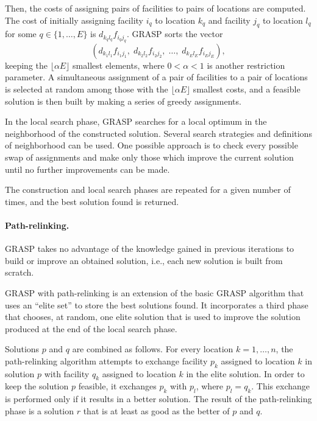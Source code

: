 Then, the costs of assigning pairs of facilities to pairs of locations are
computed. The cost of initially assigning facility $i_q$ to location $k_q$ and
facility $j_q$ to location $l_q$ for some $q\in\{1,\ldots,E\}$ is
$d_{k_q l_q} f_{i_q j_q}$. GRASP sorts the vector
\begin{displaymath}
(d_{k_1 l_1} f_{i_1 j_1},\;
 d_{k_2 l_2} f_{i_2 j_2},\; \ldots,\;
 d_{k_E l_E} f_{i_E j_E}),
\end{displaymath}
keeping the $\lfloor \alpha E \rfloor$ smallest elements, where $0 < \alpha < 1$
is another restriction parameter. A simultaneous assignment of a pair of
facilities to a pair of locations is selected at random among those with the
$\lfloor \alpha E \rfloor$ smallest costs, and a feasible solution is then built
by making a series of greedy assignments.

In the local search phase, GRASP searches for a local optimum in the
neighborhood of the constructed solution. Several search strategies and
definitions of neighborhood can be used. One possible approach is to check every
possible swap of assignments and make only those which improve the current
solution until no further improvements can be made.

The construction and local search phases are repeated for a given number of
times, and the best solution found is returned.

\paragraph{Path-relinking.}
GRASP takes no advantage of the knowledge gained in previous iterations to
build or improve an obtained solution, i.e., each new solution is built from
scratch.

GRASP with path-relinking is an extension of the basic GRASP algorithm that uses
an ``elite set'' to store the best solutions found. It incorporates a third
phase that chooses, at random, one elite solution that is used to improve the
solution produced at the end of the local search phase.

Solutions $p$ and $q$ are combined as follows. For every location
$k = 1, \ldots, n$, the path-relinking algorithm attempts to exchange facility
$p_k$ assigned to location $k$ in  solution $p$ with facility $q_k$ assigned to
location $k$ in the elite solution. In order to keep the solution $p$ feasible,
it exchanges $p_k$ with $p_l$, where $p_l = q_k$. This exchange is performed
only if it results in a better solution. The result of the path-relinking phase
is a solution $r$ that is at least as good as the better of $p$ and $q$.

